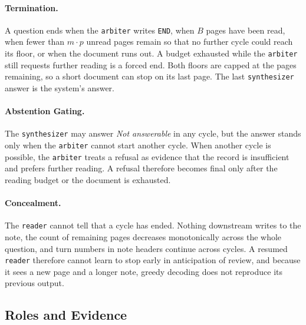 \paragraph{Termination.}
A question ends when the \texttt{arbiter} writes \texttt{END}, when $B$ pages have been read, when fewer than $m \cdot p$ unread pages remain so that no further cycle could reach its floor, or when the document runs out. A budget exhausted while the \texttt{arbiter} still requests further reading is a forced end. Both floors are capped at the pages remaining, so a short document can stop on its last page. The last \texttt{synthesizer} answer is the system's answer.

\paragraph{Abstention Gating.}
The \texttt{synthesizer} may answer \emph{Not answerable} in any cycle, but the answer stands only when the \texttt{arbiter} cannot start another cycle. When another cycle is possible, the \texttt{arbiter} treats a refusal as evidence that the record is insufficient and prefers further reading. A refusal therefore becomes final only after the reading budget or the document is exhausted.

\paragraph{Concealment.}
The \texttt{reader} cannot tell that a cycle has ended. Nothing downstream writes to the note, the count of remaining pages decreases monotonically across the whole question, and turn numbers in note headers continue across cycles. A resumed \texttt{reader} therefore cannot learn to stop early in anticipation of review, and because it sees a new page and a longer note, greedy decoding does not reproduce its previous output.

\subsection{Roles and Evidence}
\label{app:roles}





